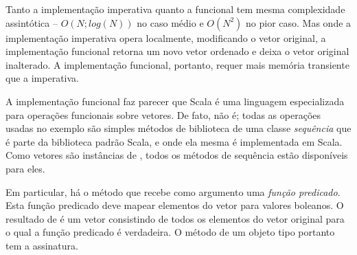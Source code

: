 Tanto a implementa\c{c}\~{a}o imperativa quanto a funcional tem mesma complexidade
assint\'{o}tica -- $O(N;log(N))$ no caso m\'{e}dio e $O(N^2)$ no pior caso. Mas onde
a implementa\c{c}\~{a}o imperativa opera localmente, modificando o vetor original,
a implementa\c{c}\~{a}o funcional retorna um novo vetor ordenado e deixa o vetor
original inalterado. A implementa\c{c}\~{a}o funcional, portanto, requer mais
mem\'{o}ria transiente que a imperativa.

A implementa\c{c}\~{a}o funcional faz parecer que Scala \'{e} uma linguagem
especializada para opera\c{c}\~{o}es funcionais sobre vetores. De fato, n\~{a}o \'{e};
todas as opera\c{c}\~{o}es usadas no exemplo s\~{a}o simples m\'{e}todos de biblioteca
de uma classe {\em sequ\^{e}ncia}  que \'{e} parte da biblioteca
padr\~{a}o Scala, e onde ela mesma \'{e} implementada em Scala. Como vetores s\~{a}o 
inst\^{a}ncias de \verb@Seq@, todos os m\'{e}todos de sequ\^{e}ncia est\~{a}o dispon\'{i}veis
para eles.

Em particular, h\'{a} o m\'{e}todo  que recebe como argumento uma
{\em fun\c{c}\~{a}o predicado}. Esta fun\c{c}\~{a}o predicado deve mapear elementos do 
vetor para valores boleanos. O resultado de  \'{e} um vetor
consistindo de todos os elementos do vetor original para o qual a fun\c{c}\~{a}o
predicado \'{e} verdadeira. O m\'{e}todo  de um objeto tipo
 portanto tem a assinatura. 



